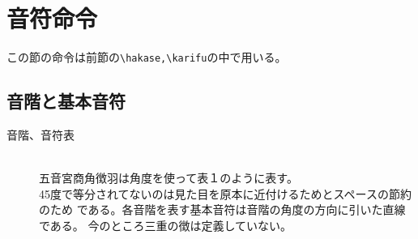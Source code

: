 \documentclass[a4paper,luatex]{l3doc}
\begin{document}
\section{音符命令}
この節の命令は前節の\verb|\hakase,\karifu|の中で用いる。
\setlength{\columnseprule}{0.5pt}
\subsection{音階と基本音符}
\begin{description}
 \item[音階、音符表]{　}\\
五音宮商角徴羽は角度を使って表１のように表す。\\
45度で等分されてないのは見た目を原本に近付けるためとスペースの節約のため
である。各音階を表す基本音符は音階の角度の方向に引いた直線である。
今のところ三重の徴は定義していない。


\end{description}
\end{document}
